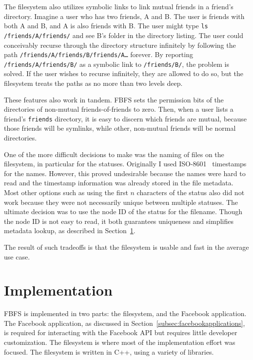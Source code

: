 \documentclass[11pt,twocolumn]{article}
\begin{document}
The filesystem also utilizes symbolic links to link mutual friends in a
friend's directory. Imagine a user who has two friends, A and B. The user is
friends with both A and B, and A is also friends with B. The user might type
\texttt{ls /friends/A/friends/} and see B's folder in the directory listing.
The user could conceivably recurse through the directory structure infinitely
by following the path \texttt{/friends/A/friends/B/friends/A\dots} forever. By
reporting \texttt{/friends/A/friends/B/} as a symbolic link to
\texttt{/friends/B/}, the problem is solved. If the user wishes to recurse
infinitely, they are allowed to do so, but the filesystem treats the paths as
no more than two levels deep.

These features also work in tandem. FBFS sets the permission bits of the
directories of non-mutual friends-of-friends to zero. Then, when a user lists a
friend's \texttt{friends} directory, it is easy to discern which friends are
mutual, because those friends will be symlinks, while other, non-mutual friends
will be normal directories.

One of the more difficult decisions to make was the naming of files on the
filesystem, in particular for the statuses. Originally I used
ISO-8601~\cite{ISO:1988:IDE} timestamps for the names. However, this proved
undesirable because the names were hard to read and the timestamp information
was already stored in the file metadata. Most other options such as using the
first $n$ characters of the status also did not work because they were not
necessarily unique between multiple statuses. The ultimate decision was to use
the node ID of the status for the filename. Though the node ID is not easy to
read, it both guarantees uniqueness and simplifies metadata lookup, as
described in Section~\ref{sec:implementation}.

The result of such tradeoffs is that the filesystem is usable and fast in the
average use case.

\section{Implementation}
\label{sec:implementation}

FBFS is implemented in two parts: the filesystem, and the Facebook application.
The Facebook application, as discussed in
Section~\ref{subsec:facebookapplications}, is required for interacting with the
Facebook API but requires little developer customization. The filesystem is
where most of the implementation effort was focused. The filesystem is written
in C++, using a variety of libraries.
\end{document}
